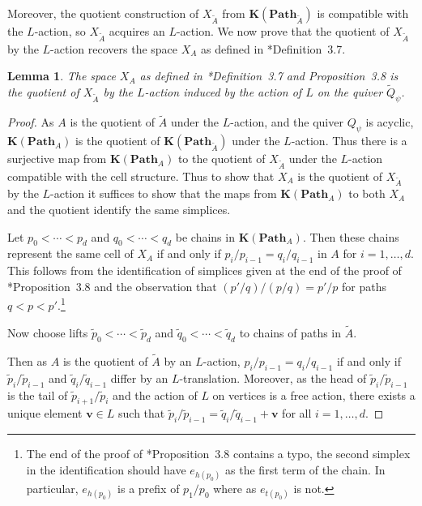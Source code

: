 \documentclass{amsart}
\newcommand{\Path}{\mathbf{Path}}
\newcommand{\Order}{\mathbf{K}}
\newtheorem{lemma}[theorem]{Lemma}
\theoremstyle{remark}
\begin{document}
Moreover, the quotient construction of $X_{\widetilde{A}}$ from $\Order(\Path_{\widetilde{A}})$ is compatible with the $L$-action, so $X_{\widetilde{A}}$ acquires an $L$-action. We now prove that the quotient of $X_{\widetilde{A}}$ by the $L$-action recovers the space $X_{A}$ as defined in \cite{FH25}*{Definition~3.7}.
\begin{lemma}
  \label{lem:XA-quotient}
  The space $X_A$ as defined in \cite{FH25}*{Definition~3.7 and Proposition~3.8} is the quotient of $X_{\widetilde{A}}$ by the $L$-action induced by the action of $L$ on the quiver $\widetilde{Q}_\psi$.
\end{lemma}
\begin{proof}

  As $A$ is the quotient of $\widetilde{A}$ under the $L$-action, and the quiver $Q_\psi$ is acyclic, $\Order(\Path_{A})$ is the quotient of $\Order(\Path_{\widetilde{A}})$ under the $L$-action. Thus there is a surjective map from $\Order(\Path_{A})$ to the quotient of $X_{\widetilde{A}}$ under the $L$-action compatible with the cell structure.
  Thus to show that $X_A$ is the quotient of $X_{\widetilde{A}}$ by the $L$-action it suffices to show that the maps from $\Order(\Path_A)$ to both $X_{A}$ and the quotient identify the same simplices.

  Let $p_0<\cdots<p_d$ and $q_0<\cdots<q_d$ be chains in $\Order(\Path_A)$.
  Then these chains represent the same cell of $X_A$ if and only if $p_i/p_{i-1} = q_i/q_{i-1}$ in $A$ for $i=1,\ldots,d$. This follows from the identification of simplices given at the end of the proof of \cite{FH25}*{Proposition~3.8} and the observation that $(p'/q)/(p/q) = p'/p$ for paths $q<p<p'$.\footnote{The end of the proof of \cite{FH25}*{Proposition~3.8} contains a typo, the second simplex in the identification should have $e_{h(p_0)}$ as the first term of the chain. In particular, $e_{h(p_0)}$ is a prefix of $p_1/p_0$ where as $e_{t(p_0)}$ is not.}

  Now choose lifts
  $\widetilde{p}_0<\cdots < \widetilde{p}_d$ and $\widetilde{q}_0<\cdots < \widetilde{q}_d$
  to chains of paths in $\widetilde{A}$.

  Then as $A$ is the quotient of $\widetilde{A}$ by an $L$-action, $p_i/p_{i-1} = q_i/q_{i-1}$ if and only if
  $\widetilde{p}_i/\widetilde{p}_{i-1}$ and $\widetilde{q}_i/\widetilde{q}_{i-1}$ differ by an $L$-translation.
  Moreover, as the head of $\widetilde{p}_{i}/\widetilde{p}_{i-1}$ is the tail of $\widetilde{p}_{i+1}/\widetilde{p}_i$ and the action of $L$ on vertices is a free action, there exists a unique element $\bm{v}\in L$ such that $\widetilde{p}_i/\widetilde{p}_{i-1}=\widetilde{q}_i/\widetilde{q}_{i-1} + \bm{v}$ for all $i=1,\ldots,d$.


\end{proof}
\end{document}
